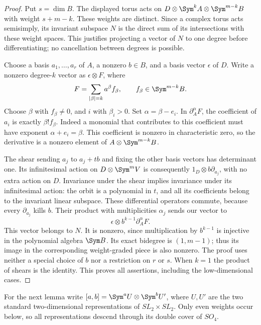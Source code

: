 \begin{proof}
Put \(s=\dim B\).  The displayed torus acts on
\(D\otimes\Sym^kA\otimes\Sym^{m-k}B\) with weight
\(s+m-k\).  These weights are distinct.  Since a complex torus
acts semisimply, its invariant subspace \(N\) is the direct sum
of its intersections with these weight spaces.  This justifies
projecting a vector of \(N\) to one degree before differentiating;
no cancellation between degrees is possible.

Choose a basis \(a_1,\ldots,a_r\) of \(A\), a nonzero
\(b\in B\), and a basis vector \(\epsilon\) of \(D\).
Write a nonzero degree-\(k\) vector as \(\epsilon\otimes F\),
where
\[
 F=\sum_{|\beta|=k}a^\beta f_\beta,\qquad
                 f_\beta\in\Sym^{m-k}B.
\]
Choose \(\beta\) with \(f_\beta\ne0\), and \(i\) with
\(\beta_i>0\).  Set \(\alpha=\beta-e_i\).  In
\(\partial_A^\alpha F\), the coefficient of \(a_i\) is
exactly \(\beta!f_\beta\).  Indeed a monomial that contributes
to this coefficient must have exponent \(\alpha+e_i=\beta\).
This coefficient is nonzero in characteristic zero, so the derivative
is a nonzero element of \(A\otimes\Sym^{m-k}B\).

The shear sending \(a_j\) to \(a_j+tb\) and fixing the other
basis vectors has determinant one.  Its infinitesimal action on
\(D\otimes\Sym^mV\) is consequently
\(1_D\otimes b\partial_{a_j}\), with no extra action on
\(D\).  Invariance under the shear implies invariance under its
infinitesimal action: the orbit is a polynomial in \(t\), and
all its coefficients belong to the invariant linear subspace.
These differential operators commute, because every
\(\partial_{a_j}\) kills \(b\).  Their product with
multiplicities \(\alpha_j\) sends our vector to
\[
 \epsilon\otimes b^{k-1}\partial_A^\alpha F.
\]
This vector belongs to \(N\).  It is nonzero, since multiplication
by \(b^{k-1}\) is injective in the polynomial algebra \(\Sym B\).
Its exact bidegree is \((1,m-1)\); thus its image in the corresponding
weight-graded piece is also nonzero.  The proof uses neither a special
choice of \(b\) nor a restriction on \(r\) or \(s\).  When
\(k=1\) the product of shears is the identity.  This proves all
assertions, including the low-dimensional cases.
\end{proof}

For the next lemma write
\([a,b]=\Sym^a U\otimes\Sym^b U'\), where \(U,U'\)
are the two standard two-dimensional representations of
\(SL_2\times SL_2\).  Only even weights occur below, so all
representations descend through its double cover of \(SO_4\).

